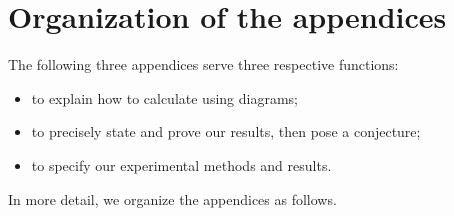 \documentclass{article}
\theoremstyle{plain}
\theoremstyle{definition}
\begin{document}
        

\newpage
    
    


\clearpage
\newpage
\renewcommand{\thesection}{\Alph{section}}
\setcounter{section}{0}

\section*{Organization of the appendices}
    The following three appendices serve three respective functions:
    \begin{itemize}[noitemsep]
        \item to explain how to calculate using diagrams;
        \item to precisely state and prove our results, then pose a conjecture;
        \item to specify our experimental methods and results.
    \end{itemize}
    In more detail, we organize the appendices as follows.\\
\end{document}
